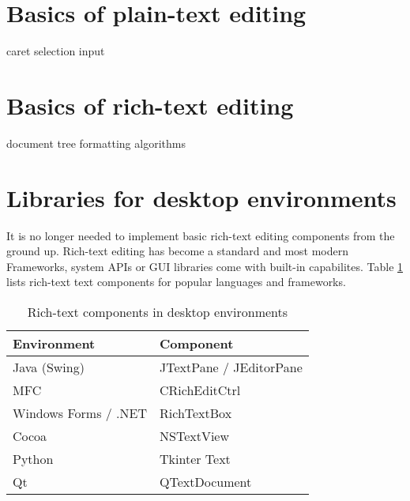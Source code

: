 
\section{Basics of plain-text editing} %

caret
selection
input

\section{Basics of rich-text editing} %

document tree
formatting algorithms


\section{Libraries for desktop environments}

It is no longer needed to implement basic rich-text editing components from the ground up. Rich-text editing has become a standard and most modern Frameworks, system APIs or GUI libraries come with built-in capabilites. Table \ref{table:rich-text-components-desktop} lists rich-text text components for popular languages and frameworks.

\begin{table}[]
\centering
\begin{tabular}{ll}
\hline
Environment & Component \\ \hline
Java (Swing) & JTextPane / JEditorPane \\
MFC & CRichEditCtrl \\
Windows Forms / .NET & RichTextBox \\
Cocoa & NSTextView \\
Python & Tkinter Text \\
Qt & QTextDocument \\ \hline
\end{tabular}
\caption{Rich-text components in desktop environments}
\label{table:rich-text-components-desktop}
\end{table}
